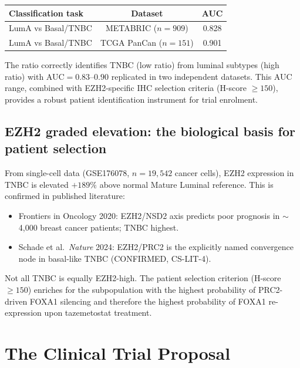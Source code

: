 \documentclass[12pt, a4paper]{article}
\begin{document}
\begin{center}
\begin{tabular}{lcc}
\toprule
\textbf{Classification task} & \textbf{Dataset}
& \textbf{AUC} \\
\midrule
LumA vs Basal/TNBC & METABRIC ($n=909$) & 0.828 \\
LumA vs Basal/TNBC & TCGA PanCan ($n=151$) & 0.901 \\
\bottomrule
\end{tabular}
\end{center}

The ratio correctly identifies TNBC (low ratio) from
luminal subtypes (high ratio) with AUC$=0.83$--$0.90$
replicated in two independent datasets. This AUC range,
combined with EZH2-specific IHC selection criteria
(H-score $\geq 150$), provides a robust patient
identification instrument for trial enrolment.

\subsection{EZH2 graded elevation: the biological basis
for patient selection}

From single-cell data (GSE176078, $n=19{,}542$ cancer
cells), EZH2 expression in TNBC is elevated $+189\%$
above normal Mature Luminal reference. This is confirmed
in published literature:

\begin{itemize}[noitemsep]
  \item Frontiers in Oncology 2020: EZH2/NSD2 axis
        predicts poor prognosis in $\sim$4,000 breast
        cancer patients; TNBC highest.
  \item Schade et al.\ \textit{Nature} 2024: EZH2/PRC2
        is the explicitly named convergence node in
        basal-like TNBC (CONFIRMED, CS-LIT-4).
\end{itemize}

Not all TNBC is equally EZH2-high. The patient selection
criterion (H-score $\geq 150$) enriches for the
subpopulation with the highest probability of PRC2-driven
FOXA1 silencing and therefore the highest probability
of FOXA1 re-expression upon tazemetostat treatment.

\section{The Clinical Trial Proposal}
\end{document}

